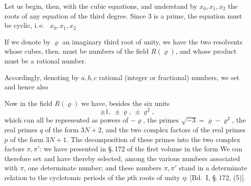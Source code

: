 Let us begin, then, with the cubic equations, and understand
by $x_0, x_1, x_2$ the roots of any 
equation of the third degree. Since 3 is a prime, the
equation must be cyclic, i.\,e.\  $x_0, x_1, x_2$ 

If we denote by $\varrho$ an imaginary third root of unity,
we have the two resolvents
whose cubes, then. must be numbers of the field $R(\varrho)$, and whose product %
must be a rational number.

Accordingly, denoting by $a, b, c$ rational (integer
or fractional) numbers, we set
and hence also

Now in the field $R(\varrho)$ we have, besides the six units
\[ \pm 1,\ \pm\varrho,\ \pm\varrho^2, \]
which can all be represented as powers of $-\varrho$, the
primes $\sqrt{-3} = \varrho - \varrho^2$, the real primes $q$ of the
form $3N+2$, and the two complex factors of the real
primes $p$ of the form $3N+1$. The decomposition of these
primes into the two complex factors $\pi, \pi'$:
we have presented in \S.\,172 of the first volume in the form
We can therefore set
and have thereby selected, among the various numbers associated
with $\pi$, one determinate number; and these numbers
$\pi, \pi'$ stand in a determinate relation to the cyclotomic
periods of the $p$th roots of unity $\eta$:
[Bd.\ I, \S.\,172, (5)].
